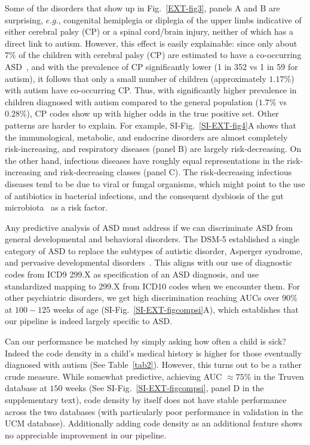 \documentclass[onecolumn,,10pt]{IEEEtran}
\begin{document}
Some of the disorders that show up in Fig.~\ref{EXT-fig3}, panels A and B are  surprising, $e.g.$,  congenital hemiplegia or diplegia of the upper limbs indicative of either  cerebral palsy (CP) or a spinal cord/brain injury, neither of which has a direct  link to autism. However, this effect is easily explainable: since only about $7\%$ of the children with  cerebral palsy (CP) are estimated to have a  co-occurring ASD~\cite{cdccp,christensen2014prevalence}, and with the prevalence of CP  significantly lower  (1 in 352 vs 1 in 59 for autism), it follows that  only a small number of children (approximately $1.17\%$) with autism have co-occurring CP. Thus, with significantly higher prevalence in children diagnosed with autism compared to the general population ($1.7\%$ vs $0.28\%$), CP codes show  up with higher odds in the true positive set. Other patterns are harder to explain. For example,  SI-Fig.~\ref{SI-EXT-fig4}A shows that the immunological, metabolic, and endocrine disorders are almost completely risk-increasing, and respiratory diseases (panel B) are largely risk-decreasing. On the other hand, infectious diseases have roughly equal representations in the risk-increasing and risk-decreasing classes (panel C). The risk-decreasing infectious diseases tend to be due to viral or fungal organisms, which might point to the use of antibiotics in bacterial infections, and the consequent dysbiosis of the gut microbiota~\cite{pmid30823414,pmid27957319} as a risk factor.

Any predictive analysis of ASD must address if we can
discriminate  ASD from  general developmental and behavioral disorders.
The DSM-5 established a single category of ASD to replace
the subtypes of autistic disorder, Asperger syndrome, and pervasive developmental disorders~\cite{hyman2020identification}. This aligns with our use of diagnostic codes from ICD9 299.X as specification of an ASD diagnosis, and use standardized mapping to 299.X from ICD10 codes when we encounter them. For other psychiatric disorders, we get  high discrimination reaching AUCs over $90\%$ at $100 -125$ weeks of age (SI-Fig.~\ref{SI-EXT-figcompsi}A), which establishes that our pipeline is indeed largely specific to ASD.

Can our performance be matched by simply asking how often a child is sick? Indeed the code density in a child's medical history is higher for those eventually diagnosed with autism (See Table~\ref{tab2}). However, this turns out to be a rather crude measure. While somewhat predictive,  achieving AUC  $\approx 75\%$ in the Truven database at $150$ weeks (See SI-Fig.~\ref{SI-EXT-figcompsi}, panel D in the supplementary text), code density by itself does not have stable  performance across the two databases (with particularly poor performance in validation in the UCM database). Additionally adding code density as an additional  feature shows  no appreciable  improvement in our pipeline. 
\end{document}
